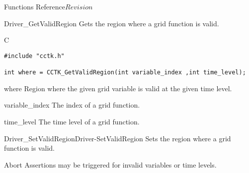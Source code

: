 \begin{cactuspart}{ Functions Reference}{}{$Revision$}
\begin{Lentry}
\end{Lentry}

\begin{FunctionDescription}{Driver\_GetValidRegion}
\label{Driver-GetValidRegion}
Gets the region where a grid function is valid.
\begin{SynopsisSection}
\begin{Synopsis}{C}
\begin{verbatim}
#include "cctk.h"

int where = CCTK_GetValidRegion(int variable_index ,int time_level);

\end{verbatim}
\end{Synopsis}
\end{SynopsisSection}

\begin{ResultSection}
\begin{Result}{where}
Region where the given grid variable is valid at the given time level.
\end{Result}
\end{ResultSection}

\begin{ParameterSection}
\begin{Parameter}{variable\_index}
The index of a grid function.
\end{Parameter}
\end{ParameterSection}

\begin{ParameterSection}
\begin{Parameter}{time\_level}
The time level of a grid function.
\end{Parameter}
\end{ParameterSection}

\begin{SeeAlsoSection}
\begin{SeeAlso2}{Driver\_SetValidRegion}{Driver-SetValidRegion}
Sets the region where a grid function is valid.
\end{SeeAlso2}
\end{SeeAlsoSection}

\begin{ErrorSection}
\begin{Error}{Abort}
Assertions may be triggered for invalid variables or time levels.
\end{Error}
\end{ErrorSection}
\end{FunctionDescription}


\end{cactuspart}

